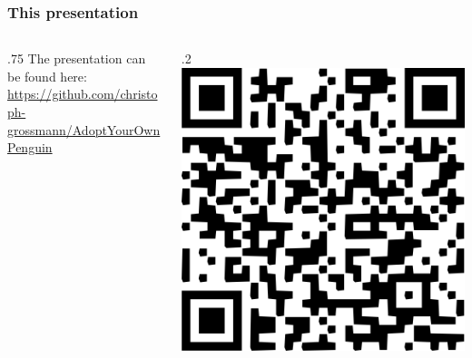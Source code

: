 \newcommand{\selfrefleftcolumn}{.75\linewidth}
\newcommand{\selfrefrightcolumn}{.2\linewidth}

\begin{frame}
	\frametitle{This presentation}
	
	\begin{columns}%
		\begin{column}{\selfrefleftcolumn}%
			The presentation can be found here:\\[.2\baselineskip]%
			\url{https://github.com/christoph-grossmann/AdoptYourOwnPenguin}%
		\end{column}%
		\hfill%
		\begin{column}{\selfrefrightcolumn}%
			\includegraphics[width=\linewidth]{../graphics/repo_link_qr_code.png}%
		\end{column}%
	\end{columns}%
	
	\vfill%
	

\end{frame}
